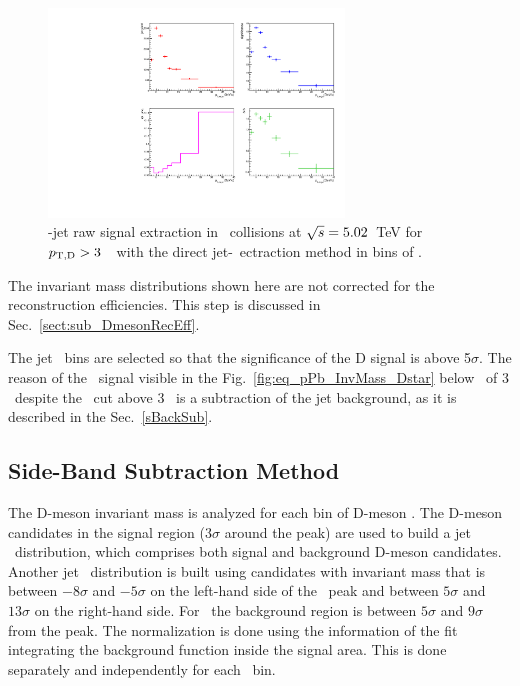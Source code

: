 \begin{figure}[H]%
\centering
\includegraphics[width=0.7\textwidth]{pPbplots/plotsEffScale_noEff_pt3_noDetails/signalParams_FASTwoSDD}
\caption{\Dstar-jet raw signal extraction in \pPb\ collisions at $\sqrt{s}=5.02$~TeV for $p_{\mathrm{T,D}}>3$~\GeVc\ with the direct jet-\pt\ ectraction method in bins of \ptchjet.}
\label{fig:eq_pPb_RSU_raw}
\end{figure}

The invariant mass distributions shown here are not corrected for the reconstruction efficiencies. This step is discussed in Sec.~\ref{sect:sub_DmesonRecEff}.

The jet \pt\ bins are selected so that the significance of the D signal is above 5$\sigma$.
The reason of the \Dstar\ signal visible in the Fig.~\ref{fig:eq_pPb_InvMass_Dstar} below \ptjet\ of 3 \GeVc\ despite the \ptd\ cut above 3 \GeVc\ is a subtraction of the jet background, as it is described in the Sec.~\ref{sBackSub}.


\subsection{Side-Band Subtraction Method}
\label{sub_Bin_d_pT}

The D-meson invariant mass is analyzed for each bin of D-meson \pt. 
The D-meson candidates in the signal region ($3\sigma$ around the peak) are used to build a jet \pt\ distribution, which comprises both signal and background D-meson candidates.
Another jet \pt\ distribution is built using candidates with invariant mass that is between $-8\sigma$ and $-5\sigma$ on the left-hand side of the \Dstar\ peak 
and between $5\sigma$ and $13\sigma$ on the right-hand side.
For \Dzero\ the background region is between $5\sigma$ and $9\sigma$ from the peak.
The normalization is done using the information of the fit integrating the background function inside the signal area. This is done separately and independently for each \ptd\ bin.

